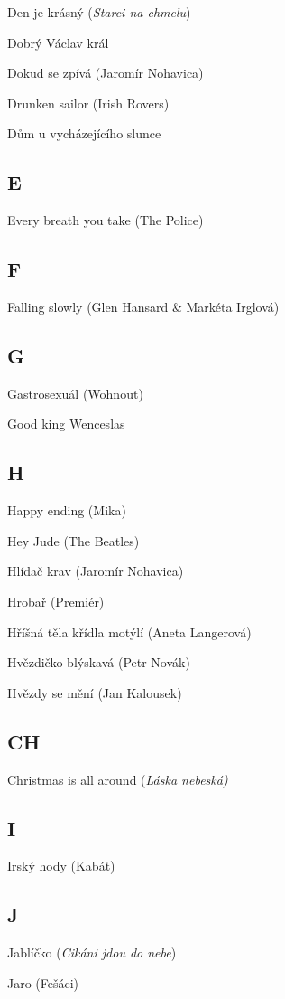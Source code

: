 \begin{multicols}{2}
Den je krásný (\emph{Starci na chmelu})

Dobrý Václav král

Dokud se zpívá (Jaromír Nohavica)

Drunken sailor (Irish Rovers)

Dům u vycházejícího slunce

\subsection*{E}
Every breath you take (The Police)

\subsection*{F}
Falling slowly (Glen Hansard \& Markéta Irglová)

\subsection*{G}
Gastrosexuál (Wohnout)

Good king Wenceslas

\subsection*{H}
Happy ending (Mika)

Hey Jude (The Beatles)

Hlídač krav (Jaromír Nohavica)

Hrobař (Premiér)

Hříšná těla křídla motýlí (Aneta Langerová)

Hvězdičko blýskavá (Petr Novák)

Hvězdy se mění (Jan Kalousek)

\subsection*{CH}
Christmas is all around (\emph{Láska nebeská)}

\subsection*{I}
Irský hody (Kabát)

\subsection*{J}
Jablíčko (\emph{Cikáni jdou do nebe})

Jaro (Fešáci)


\end{multicols}
